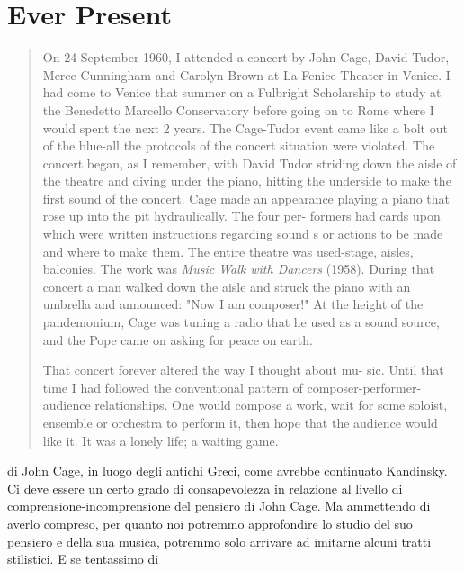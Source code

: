 \section*{Ever Present}


\begin{quote}
	On 24 September 1960, I attended a concert by John Cage, David Tudor, Merce Cunningham and Carolyn Brown at La
	Fenice Theater in Venice. I had come to Venice that summer on a Fulbright Scholarship to study at the Benedetto
	Marcello Conservatory before going on to Rome where I would spent the next 2 years. The Cage-Tudor event came
	like a bolt out of the blue-all the protocols of the concert situation were violated.
	The concert began, as I remember, with David Tudor striding down the aisle of the theatre and diving under
	the piano, hitting the underside to make the first sound of the concert. Cage made an appearance playing
	a piano that rose up into the pit hydraulically. The four per- formers had cards upon which were written instructions
	regarding sound s or actions to be made and where to make them. The entire theatre was used-stage, aisles, balconies.
	The work was \emph{Music Walk with Dancers} (1958). During that concert a man walked down the aisle and struck the piano
	with an umbrella and announced: "Now I am composer!" At the height of the pandemonium, Cage was tuning a radio
	that he used as a sound source, and the Pope came on asking for peace on earth.

	That concert forever altered the way I thought about mu- sic. Until that time I had followed the conventional pattern of
	composer-performer-audience relationships. One would compose a work, wait for some soloist, ensemble or orchestra to perform it, then hope that the audience would like it. It was a lonely life; a waiting game.
\end{quote}

di John Cage, in luogo degli antichi Greci, come avrebbe continuato Kandinsky.
Ci deve essere un certo grado di consapevolezza in relazione al livello di
comprensione-incomprensione del pensiero di John Cage. Ma ammettendo di
averlo compreso, per quanto noi potremmo approfondire lo studio del suo
pensiero e della sua musica, potremmo solo arrivare ad imitarne alcuni tratti
stilistici. E se tentassimo di

